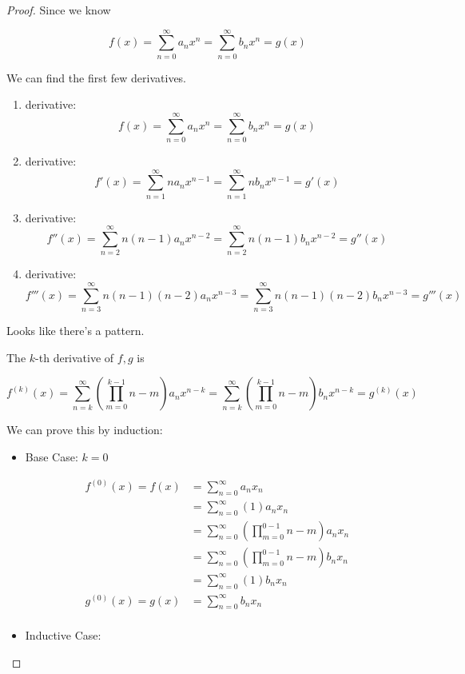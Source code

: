 \documentclass[12pt,letterpaper]{article}
\begin{document}
\begin{enumerate}
\begin{enumerate}
\begin{proof}
            Since we know

            \[
              f(x) = \sum_{n = 0}^{\infty} a_n x^n = \sum_{n = 0}^{\infty} b_n x^n = g(x)
            \]

            We can find the first few derivatives.

            \begin{enumerate}
              \item
                 derivative:
                \[
                  f(x) = \sum_{n = 0}^{\infty} a_n x^n = \sum_{n = 0}^{\infty} b_n x^n = g(x)
                \]
              \item
                 derivative:
                \[
                  f'(x) = \sum_{n = 1}^{\infty} n a_n x^{n - 1} = \sum_{n = 1}^{\infty} n b_n x^{n - 1} = g'(x)
                \]
              \item
                 derivative:
                \[
                  f''(x) = \sum_{n = 2}^{\infty} n(n - 1) a_n x^{n - 2} = \sum_{n = 2}^{\infty} n(n - 1) b_n x^{n - 2} = g''(x)
                \]
              \item
                 derivative:
                \[
                  f'''(x) = \sum_{n = 3}^{\infty} n(n - 1)(n - 2) a_n x^{n - 3} = \sum_{n = 3}^{\infty} n(n - 1)(n - 2) b_n x^{n - 3} = g'''(x)
                \]
            \end{enumerate}

            Looks like there's a pattern.

            The $k$-th derivative of $f, g$ is

            \[
              f^{(k)}(x) = \sum_{n = k}^{\infty} \left(\prod_{m = 0}^{k - 1} n - m\right) a_n x^{n - k} = \sum_{n = k}^{\infty} \left(\prod_{m = 0}^{k - 1} n - m\right) b_n x^{n - k} = g^{(k)}(x)
            \]

            We can prove this by induction:

            \begin{itemize}
              \item Base Case: $k = 0$

                \begin{align*}
                  f^{(0)}(x) = f(x) &= \sum_{n = 0}^{\infty} a_n x_n \\
                  &= \sum_{n = 0}^{\infty} (1) a_n x_n \\
                  &= \sum_{n = 0}^{\infty} \left(\prod_{m = 0}^{0 - 1}n - m\right) a_n x_n \\
                  &= \sum_{n = 0}^{\infty} \left(\prod_{m = 0}^{0 - 1}n - m\right) b_n x_n \\
                  &= \sum_{n = 0}^{\infty} (1) b_n x_n \\
                  g^{(0)}(x) = g(x) &= \sum_{n = 0}^{\infty} b_n x_n \\
                \end{align*}
              \item Inductive Case:


\end{itemize}
\end{proof}
\end{enumerate}
\end{enumerate}
\end{document}
